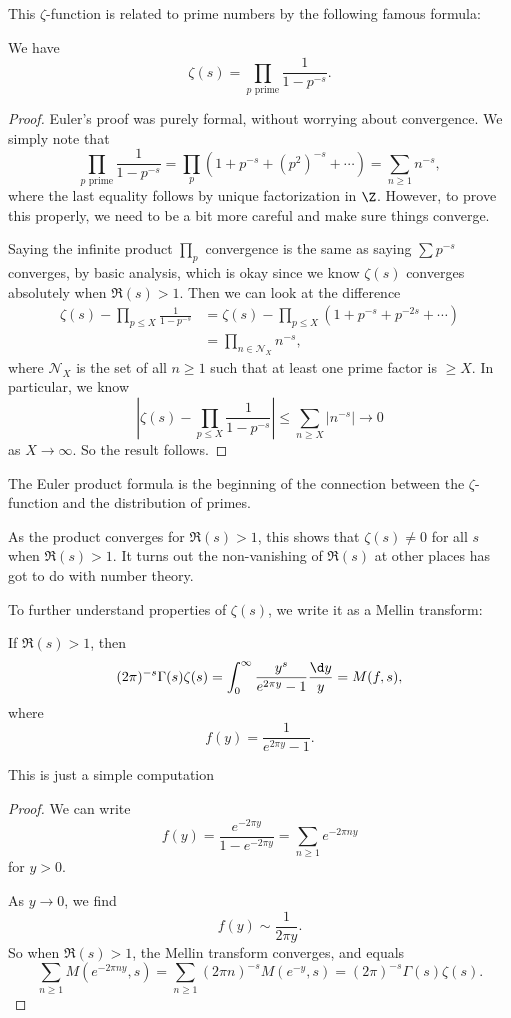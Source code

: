 \documentclass[a4paper]{article}
\begin{document}
This $\zeta$-function is related to prime numbers by the following famous formula:
\begin{prop}
  We have
  \[
    \zeta(s) = \prod_{p \text{ prime}} \frac{1}{1 - p^{-s}}.
  \]
\end{prop}

\begin{proof}
  Euler's proof was purely formal, without worrying about convergence. We simply note that
  \[
    \prod_{p\text{ prime}} \frac{1}{1 - p^{-s}} = \prod_p (1 + p^{-s} + (p^2)^{-s} + \cdots) = \sum_{n \geq 1} n^{-s},
  \]
  where the last equality follows by unique factorization in $\Z$. However, to prove this properly, we need to be a bit more careful and make sure things converge.

  Saying the infinite product $\prod_p$ convergence is the same as saying $\sum p^{-s}$ converges, by basic analysis, which is okay since we know $\zeta(s)$ converges absolutely when $\Re(s) > 1$. Then we can look at the difference
  \begin{align*}
    \zeta(s) - \prod_{p \leq X} \frac{1}{1 - p^{-s}} &= \zeta(s) - \prod_{p \leq X} (1 + p^{-s} + p^{-2s} + \cdots)\\
    &= \prod_{n \in \mathcal{N}_X} n^{-s},
  \end{align*}
  where $\mathcal{N}_X$ is the set of all $n \geq 1$ such that at least one prime factor is $\geq X$. In particular, we know
  \[
    \left|\zeta(s) - \prod_{p \leq X} \frac{1}{1 - p^{-s}}\right| \leq \sum_{n \geq X} |n^{-s}| \to 0
  \]
  as $X \to \infty$. So the result follows.
\end{proof}
The Euler product formula is the beginning of the connection between the $\zeta$-function and the distribution of primes.

As the product converges for $\Re(s) > 1$, this shows that $\zeta(s) \not= 0$ for all $s$ when $\Re(s) > 1$. It turns out the non-vanishing of $\Re(s)$ at other places has got to do with number theory.

To further understand properties of $\zeta(s)$, we write it as a Mellin transform:
\begin{thm}
  If $\Re(s) > 1$, then
  \[
    (2\pi)^{-s} \Gamma(s) \zeta(s) = \int_0^\infty \frac{y^s}{e^{2\pi y} - 1} \frac{\d y}{y} = M(f, s),
  \]
  where
  \[
    f(y) = \frac{1}{e^{2 \pi y} - 1}.
  \]
\end{thm}
This is just a simple computation

\begin{proof}
  We can write
  \[
    f(y) = \frac{e^{-2\pi y}}{1 - e^{-2 \pi y}} = \sum_{n \geq 1} e^{-2\pi n y}
  \]
  for $y > 0$.

  As $y \to 0$, we find
  \[
    f(y) \sim \frac{1}{2\pi y}.
  \]
  So when $\Re(s) > 1$, the Mellin transform converges, and equals
  \[
    \sum_{n \geq 1} M(e^{-2\pi n y}, s) = \sum_{n \geq 1} (2\pi n)^{-s} M(e^{-y}, s) = (2\pi)^{-s} \Gamma(s) \zeta(s).
  \]
\end{proof}
\end{document}
